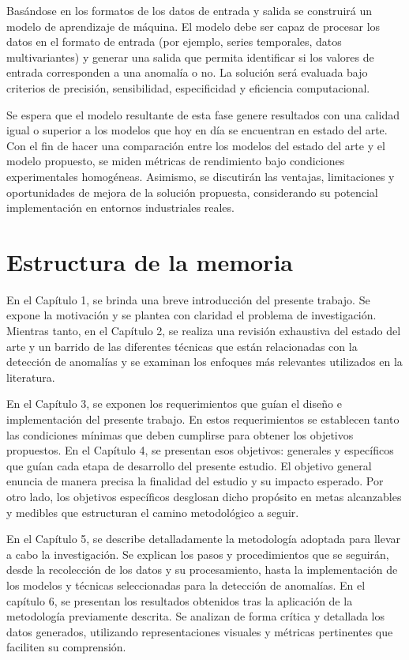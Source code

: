 \documentclass[11pt,a4paper,spanish]{book}
\numberwithin{equation}{chapter}
\numberwithin{figure}{chapter}
\begin{document}
Basándose en los formatos de los datos de entrada y salida se construirá un modelo 
de aprendizaje de máquina. 
El modelo debe ser capaz de procesar los datos en el formato de entrada 
(por ejemplo, series temporales, datos multivariantes) y generar una salida que permita
identificar si los valores de entrada corresponden a una anomalía o no. 
La solución será evaluada bajo criterios de precisión, sensibilidad, especificidad y 
eficiencia computacional.


Se espera que el modelo resultante de esta fase genere resultados con una calidad igual 
o superior a los modelos que hoy en día se encuentran en estado del  arte. Con el fin de
hacer una comparación entre los modelos del estado del arte y el modelo propuesto, se 
miden métricas de rendimiento bajo condiciones experimentales homogéneas. 
Asimismo, se discutirán las ventajas, limitaciones y oportunidades de mejora de la 
solución propuesta, considerando su potencial implementación en entornos industriales
reales.


\section{Estructura de la memoria}


En el Capítulo 1, se brinda una breve introducción del presente trabajo. 
Se expone la motivación y se plantea con claridad el problema de investigación.
Mientras tanto, en el Capítulo 2, se realiza una revisión exhaustiva del estado del arte
y un barrido de las diferentes técnicas que están relacionadas con la detección 
de anomalías y se examinan los enfoques más relevantes utilizados en la literatura.


En el Capítulo 3, se exponen los requerimientos que guían el diseño e implementación 
del presente trabajo.  En estos requerimientos se establecen tanto las condiciones mínimas 
que deben cumplirse para obtener los objetivos propuestos.
En el Capítulo 4, se presentan esos objetivos: generales y específicos que guían cada 
etapa de desarrollo del presente estudio. 
El objetivo general enuncia de manera precisa la finalidad del estudio y su impacto 
esperado. 
Por otro lado, los objetivos específicos desglosan dicho propósito en metas alcanzables 
y medibles que estructuran el camino metodológico a seguir. 


En el Capítulo 5, se describe detalladamente la metodología adoptada para llevar a 
cabo la investigación. 
Se explican los pasos y procedimientos que se seguirán, desde la recolección de los 
datos y su procesamiento, hasta la implementación de los modelos y técnicas 
seleccionadas para la detección de anomalías. 
En el capítulo 6, se presentan los resultados obtenidos tras la aplicación de la 
metodología previamente descrita. 
Se analizan de forma crítica y detallada los datos generados, utilizando 
representaciones visuales y métricas pertinentes que faciliten su comprensión. 
\end{document}
